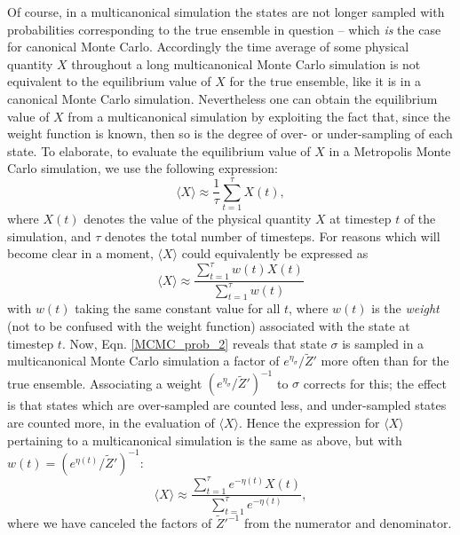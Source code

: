 \documentclass{report}
\begin{document}
Of course, in a multicanonical simulation the states are not longer sampled with probabilities corresponding to the true ensemble in question -- 
which \emph{is} the case for canonical Monte Carlo. Accordingly the time average of some physical quantity $X$ throughout a long multicanonical 
Monte Carlo simulation is not equivalent to the equilibrium value of $X$ for the true ensemble, like it is in a canonical Monte Carlo
simulation. Nevertheless one can obtain the equilibrium value of $X$ from a multicanonical simulation by exploiting the fact that, since the 
weight function is known, then so is the degree of over- or under-sampling of each state. To elaborate, to evaluate the equilibrium value of 
$X$ in a Metropolis Monte Carlo simulation, we use the following expression:
\begin{equation}
\langle X\rangle\approx\frac{1}{\tau}\sum_{t=1}^{\tau}X(t),
\end{equation}
where $X(t)$ denotes the value of the physical quantity $X$ at timestep $t$ of the simulation, and $\tau$ denotes the total number of timesteps.
For reasons which will become clear in a moment, $\langle X\rangle$ could equivalently be expressed as
\begin{equation}
\langle X\rangle\approx\frac{\displaystyle\sum_{t=1}^{\tau}w(t)X(t)}{\displaystyle\sum_{t=1}^{\tau}w(t)}
\end{equation}
with $w(t)$ taking the same constant value for all $t$, where $w(t)$ is the \emph{weight} (not to be confused with the weight function) associated 
with the state at timestep $t$.
Now, Eqn. \eqref{MCMC_prob_2} reveals that state $\sigma$ is sampled in a multicanonical Monte Carlo simulation a factor of
$e^{\eta_{\sigma}}/\tilde{Z}'$ more often than for the true ensemble. Associating a weight $(e^{\eta_{\sigma}}/\tilde{Z}')^{-1}$ to $\sigma$ corrects for
this; the effect is that states which are over-sampled are counted less, and under-sampled states are counted more, in the evaluation of $\langle X\rangle$.
Hence the expression for $\langle X\rangle$ pertaining to a multicanonical simulation is the same as above, but with $w(t)=(e^{\eta(t)}/\tilde{Z}')^{-1}$:
\begin{equation}\label{equilX_MCMC}
\langle X\rangle\approx\frac{\displaystyle\sum_{t=1}^{\tau}e^{-\eta(t)}X(t)}{\displaystyle\sum_{t=1}^{\tau}e^{-\eta(t)}},
\end{equation}
where we have canceled the factors of $\tilde{Z}'^{-1}$ from the numerator and denominator.
\end{document}
